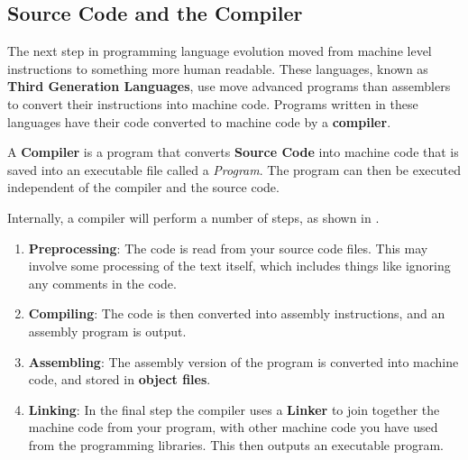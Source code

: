 \clearpage
\subsection{Source Code and the Compiler} %
\label{sub:source_code_and_the_compiler}

The next step in programming language evolution moved from machine level instructions to something more human readable. These languages, known as \textbf{Third Generation Languages}, use move advanced programs than assemblers to convert their instructions into machine code. Programs written in these languages have their code converted to machine code by a \textbf{compiler}.

A \textbf{Compiler} is a program that converts \textbf{Source Code} into machine code that is saved into an executable file called a \emph{Program}. The program can then be executed independent of the compiler and the source code.

Internally, a compiler will perform a number of steps, as shown in .

\begin{enumerate}
  \item \textbf{Preprocessing}: The code is read from your source code files. This may involve some processing of the text itself, which includes things like ignoring any comments in the code.
  \item \textbf{Compiling}: The code is then converted into assembly instructions, and an assembly program is output.
  \item \textbf{Assembling}: The assembly version of the program is converted into machine code, and stored in \textbf{object files}.
  \item \textbf{Linking}: In the final step the compiler uses a \textbf{Linker} to join together the machine code from your program, with other machine code you have used from the programming libraries. This then outputs an executable program.
\end{enumerate}

